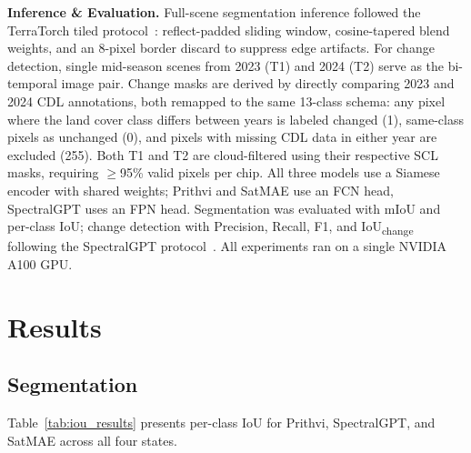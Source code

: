 \documentclass[sigconf]{acmart}
\begin{document}
\textbf{Inference \& Evaluation.}
Full-scene segmentation inference followed the TerraTorch
tiled protocol~\cite{gomes2025terratorch}: reflect-padded
sliding window, cosine-tapered blend weights, and an
8-pixel border discard to suppress edge artifacts.
For change detection, single mid-season scenes from 2023
(T1) and 2024 (T2) serve as the bi-temporal image pair.
Change masks are derived by directly comparing 2023 and
2024 CDL annotations, both remapped to the same 13-class
schema: any pixel where the land cover class differs
between years is labeled changed (1), same-class pixels
as unchanged (0), and pixels with missing CDL data in
either year are excluded (255). Both T1 and T2 are
cloud-filtered using their respective SCL masks, requiring
$\geq$95\% valid pixels per chip. All three models use a
Siamese encoder with shared weights; Prithvi and SatMAE
use an FCN head, SpectralGPT uses an FPN head.
Segmentation was evaluated with mIoU and per-class
IoU; change detection with Precision, Recall, F1, and
IoU\textsubscript{change} following the SpectralGPT
protocol~\cite{hong2024spectralgpt}. All experiments ran
on a single NVIDIA A100 GPU.


\section{Results}

\subsection{Segmentation}

Table~\ref{tab:iou_results} presents per-class IoU for
Prithvi, SpectralGPT, and SatMAE across all four states.
\end{document}
